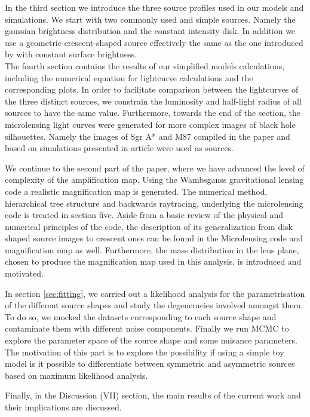 In the third section we introduce the three source profiles used in our models and simulations. We start with two commonly used and simple sources. Namely the gaussian brightness distribution and the constant intensity disk. In addition we use a geometric crescent-shaped source effectively the same as the one introduced by \citep{2013MNRAS.434..765K} with constant surface brightness. \\ The fourth section contains the results of our simplified models calculations, including the numerical equation for lightcurve calculations and the corresponding plots. 
In order to facilitate comparison between the lightcurves of the three distinct sources, we constrain the luminosity and half-light radius of all sources to have the same value. 
Furthermore, towards the end of the section, the microlensing light curves were generated for more complex images of black hole silhouettes. 
Namely the images of Sgr A* and M87 compiled in the paper \citep{2015MNRAS.446.1973R} and based on simulations presented in \citep{2009MNRAS.394L.126M} article were used as sources.     
       
We continue to the second part of the paper, where we have advanced the level of complexity of the amplification map. Using the Wambsganss gravitational lensing code \citep{1990LNP...360..186W} a realistic magnification map is generated. The numerical method, hierarchical tree structure and backwards raytracing, underlying the microlensing code is treated in section five. Aside from a basic review of the physical and numerical principles of the code, the description of its generalization from disk shaped source images to crescent ones can be found in the Microlensing code and magnification map as well. Furthermore, the mass distribution in the lens plane, chosen to produce the magnification map used in this analysis, is introduced and motivated.   

In section \ref{sec:fitting}, we carried out a likelihood analysis for the parametrisation of the different source shapes and study the degeneracies involved amongst them. To do so, we mocked the datasets corresponding to each source shape and contaminate them with different noise components. Finally we run MCMC to explore the parameter space of the source shape and some nuisance parameters. The motivation of this part is to explore the possibility if using a simple toy model is it possible to differentiate between symmetric and asymmetric sources based on maximum likelihood analysis. 


Finally, in the Discussion (VII) section, the main results of the current work and their implications are discussed. 
